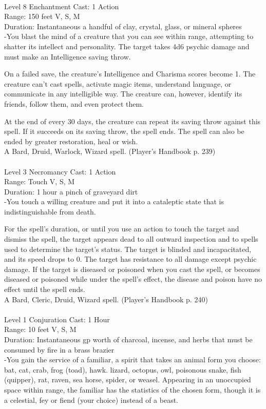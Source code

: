 \documentclass[10pt,twocolumn]{report}
\begin{document}
 \\
Level 8 \quad Enchantment \quad Cast: 1 Action\\
Range: 150 feet \quad V, S, M\\
Duration: Instantaneous \quad a handful of clay, crystal, glass, or mineral spheres\\
-You blast the mind of a creature that you can see within range, attempting to shatter its intellect and personality. The target takes 4d6 psychic damage and must make an Intelligence saving throw. 

On a failed save, the creature’s Intelligence and Charisma scores become 1. The creature can’t cast spells, activate magic items, understand language, or communicate in any intelligible way. The creature can, however, identify its friends, follow them, and even protect them. 

At the end of every 30 days, the creature can repeat its saving throw against this spell. If it succeeds on its saving throw, the spell ends. 
The spell can also be ended by greater restoration, heal or wish.\\
A Bard, Druid, Warlock, Wizard spell. (Player's Handbook p. 239) \\


 \\
Level 3 \quad Necromancy \quad Cast: 1 Action\\
Range: Touch \quad V, S, M\\
Duration: 1 hour \quad a pinch of graveyard dirt\\
-You touch a willing creature and put it into a cataleptic state that is indistinguishable from death. 

For the spell’s duration, or until you use an action to touch the target and dismiss the spell, the target appears dead to all outward inspection and to spells used to determine the target’s status. The target is blinded and incapacitated, and its speed drops to 0. 
The target has resistance to all damage except psychic damage. If the target is diseased or poisoned when you cast the spell, or becomes diseased or poisoned while under the spell’s effect, the disease and poison have no effect until the spell ends.\\
A Bard, Cleric, Druid, Wizard spell. (Player's Handbook p. 240) \\


 \\
Level 1 \quad Conjuration \quad Cast: 1 Hour\\
Range: 10 feet \quad V, S, M\\
Duration: Instantaneous  gp worth of charcoal, incense, and herbs that must be consumed by fire in a brass brazier\\
-You gain the service of a familiar, a spirit that takes an animal form you choose: bat, cat, crab, frog (toad), hawk. lizard, octopus, owl, poisonous snake, fish (quipper), rat, raven, sea horse, spider, or weasel. Appearing in an unoccupied space within range, the familiar has the statistics of the chosen form, though it is a celestial, fey or fiend (your choice) instead of a beast. 
\end{document}
